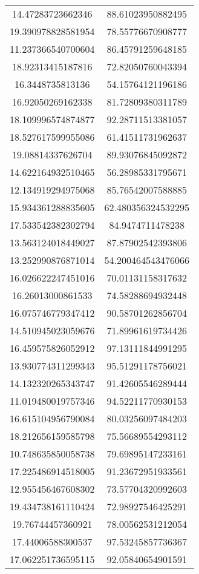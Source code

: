 \begin{table}
\begin{tabular}{cc}
14.47283723662346 & 88.61023950882495 \\
19.390978828581954 & 78.55776670908777 \\
11.237366540700604 & 86.45791259648185 \\
18.92313415187816 & 72.82050760043394 \\
16.3448735813136 & 54.15764121196186 \\
16.92050269162338 & 81.72809380311789 \\
18.109996574874877 & 92.28711513381057 \\
18.527617599955086 & 61.41511731962637 \\
19.08814337626704 & 89.93076845092872 \\
14.622164932510465 & 56.28985331795671 \\
12.134919294975068 & 85.76542007588885 \\
15.934361288835605 & 62.480356324532295 \\
17.533542382302794 & 84.9474711478238 \\
13.563124018449027 & 87.87902542393806 \\
13.252990876871014 & 54.200464543476066 \\
16.026622247451016 & 70.01131158317632 \\
16.26013000861533 & 74.58288694932448 \\
16.075746779347412 & 90.58701262856704 \\
14.510945023059676 & 71.89961619734426 \\
16.459575826052912 & 97.13111844991295 \\
13.930774311299343 & 95.51291178756021 \\
14.132320265343747 & 91.42605546289444 \\
11.019480019757346 & 94.52211770930153 \\
16.615104956790084 & 80.03256097484203 \\
18.212656159585798 & 75.56689554293112 \\
10.748635850058738 & 79.69895147233161 \\
17.225486914518005 & 91.23672951933561 \\
12.955456467608302 & 73.57704320992603 \\
19.434738161110424 & 72.98927546425291 \\
19.76744457360921 & 78.00562531212054 \\
17.44006588300537 & 97.53245857736367 \\
17.062251736595115 & 92.05840654901591 \\

\end{tabular}
\end{table}
